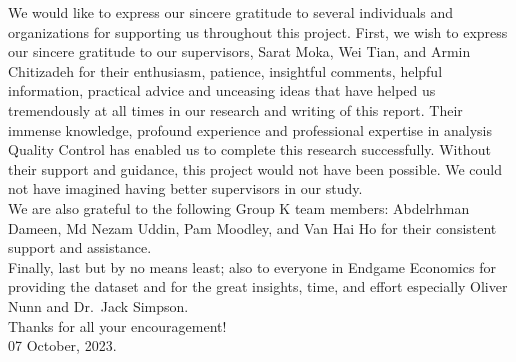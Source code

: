 \documentclass[mstat,12pt]{unswthesis}
\begin{document}
{\bigskip}We would like to express our sincere gratitude to several
individuals and organizations for supporting us throughout this project.
First, we wish to express our sincere gratitude to our supervisors,
Sarat Moka, Wei Tian, and Armin Chitizadeh for their enthusiasm,
patience, insightful comments, helpful information, practical advice and
unceasing ideas that have helped us tremendously at all times in our
research and writing of this report. Their immense knowledge, profound
experience and professional expertise in analysis Quality Control has
enabled us to complete this research successfully. Without their support
and guidance, this project would not have been possible. We could not
have imagined having better supervisors in our study.\\[1cm] We are also
grateful to the following Group K team members: Abdelrhman Dameen, Md
Nezam Uddin, Pam Moodley, and Van Hai Ho for their consistent support
and assistance.\\[1cm] Finally, last but by no means least; also to
everyone in Endgame Economics for providing the dataset and for the
great insights, time, and effort especially Oliver Nunn and Dr.~Jack
Simpson.\\[1cm] Thanks for all your encouragement!\\[1cm] 

{\bigskip\bigskip\bigskip\noindent} 07 October, 2023.



\end{document}
